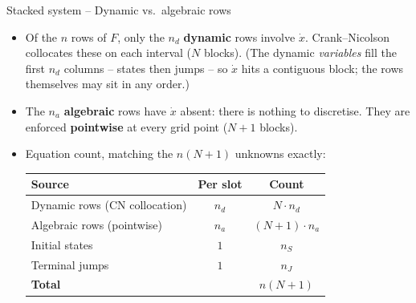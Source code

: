 \documentclass[11pt,aspectratio=169]{beamer}
\begin{document}
\begin{frame}{Stacked system -- Dynamic vs.\ algebraic rows}

\begin{itemize}

\item Of the $n$ rows of $F$, only the $n_d$ \textbf{dynamic} rows
  involve $\dot x$. Crank--Nicolson collocates these on each interval
  ($N$ blocks). (The dynamic \emph{variables} fill the first $n_d$
  columns -- states then jumps -- so $\dot x$ hits a contiguous block;
  the rows themselves may sit in any order.)\newline

\item The $n_a$ \textbf{algebraic} rows have $\dot x$ absent: there is
  nothing to discretise. They are enforced \textbf{pointwise} at every
  grid point ($N{+}1$ blocks).\newline

\item Equation count, matching the $n(N{+}1)$ unknowns exactly:
  \medskip
  \begin{center}
    \scriptsize
    \renewcommand{\arraystretch}{1.15}
    \begin{tabular}{lcc}
      \toprule
      Source & Per slot & Count \\
      \midrule
      Dynamic rows (CN collocation) & $n_d$ & $N\cdot n_d$ \\
      Algebraic rows (pointwise) & $n_a$ & $(N{+}1)\cdot n_a$ \\
      Initial states & $1$ & $n_S$ \\
      Terminal jumps & $1$ & $n_J$ \\
      \midrule
      \textbf{Total} & & $n(N{+}1)$ \\
      \bottomrule
    \end{tabular}
  \end{center}

\end{itemize}

\end{frame}
\end{document}
